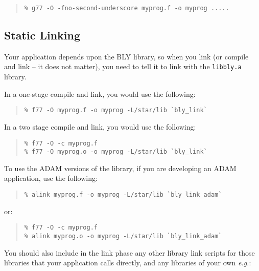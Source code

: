\documentclass[twoside,11pt]{article}
\newcommand{\xlabel}[1]{}
\begin{document}
\begin{quote}
\begin{verbatim}
% g77 -O -fno-second-underscore myprog.f -o myprog .....
\end{verbatim}
\end{quote}

\subsection{\xlabel{static_linking}Static Linking}
\label{static_linking}

Your application depends upon the BLY library, so when you link (or 
compile and link -- it does not matter), you need to tell it to link with 
the \texttt{libbly.a} library.

In a one-stage compile and link, you would use the following:

\begin{quote}
\begin{verbatim}
% f77 -O myprog.f -o myprog -L/star/lib `bly_link`
\end{verbatim}
\end{quote}

In a two stage compile and link, you would use the following:

\begin{quote}
\begin{verbatim}
% f77 -O -c myprog.f
% f77 -O myprog.o -o myprog -L/star/lib `bly_link`
\end{verbatim}
\end{quote}

To use the ADAM versions of the library, if you are developing an ADAM 
application, use the following:

\begin{quote}
\begin{verbatim}
% alink myprog.f -o myprog -L/star/lib `bly_link_adam`
\end{verbatim}
\end{quote}
or:
\begin{quote}
\begin{verbatim}
% f77 -O -c myprog.f
% alink myprog.o -o myprog -L/star/lib `bly_link_adam`
\end{verbatim}
\end{quote}

You should also include in the link phase any other library link scripts
for those libraries that your application calls directly, and any 
libraries of your own \emph{e.g.}:
\end{document}
